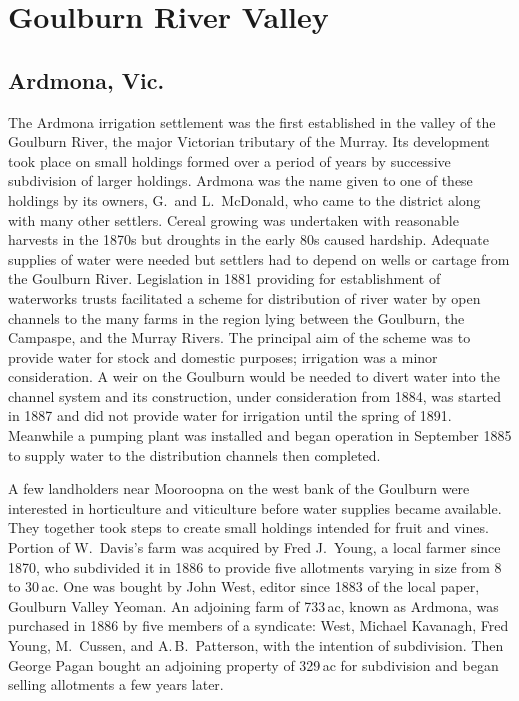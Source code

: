 \section*{Goulburn River Valley}

\subsection*{Ardmona, Vic.}

The Ardmona irrigation settlement was the first established in the
valley of the Goulburn River, the major Victorian tributary of the
Murray.  Its development took place on small holdings formed over a
period of years by successive subdivision of larger holdings.  Ardmona
was the name given to one of these holdings by its owners, G.~and
L.~McDonald, who came to the district along with many other settlers.
Cereal growing was undertaken with reasonable harvests in the 1870s
but droughts in the early 80s caused hardship.  Adequate supplies of
water were needed but settlers had to depend on wells or cartage from
the Goulburn River.  Legislation in 1881 providing for establishment
of waterworks trusts facilitated a scheme for distribution of river
water by open channels to the many farms in the region lying between
the Goulburn, the Campaspe, and the Murray Rivers.  The principal aim
of the scheme was to provide water for stock and domestic purposes;
irrigation was a minor consideration.  A weir on the Goulburn would be
needed to divert water into the channel system and its construction,
under consideration from 1884, was started in 1887 and did not provide
water for irrigation until the spring of 1891. Meanwhile a pumping
plant was installed and began operation in September 1885 to supply
water to the distribution channels then
completed.

A few landholders near Mooroopna on the west bank of the Goulburn were
interested in horticulture and viticulture before water supplies
became available.  They together took steps to create small holdings
intended for fruit and vines.  Portion of W.~Davis's farm was acquired
by Fred J.~Young, a local farmer since 1870, who subdivided it in 1886
to provide five allotments varying in size from 8 to 30\,ac. One was
bought by John West, editor since 1883 of the local paper, Goulburn
Valley Yeoman.  An adjoining farm of 733\,ac, known as Ardmona, was
purchased in 1886 by five members of a syndicate: West, Michael
Kavanagh, Fred Young, M.~Cussen, and A.\,B.~Patterson, with the
intention of subdivision.  Then George Pagan bought an adjoining
property of 329\,ac for subdivision and began selling allotments a few
years later.

